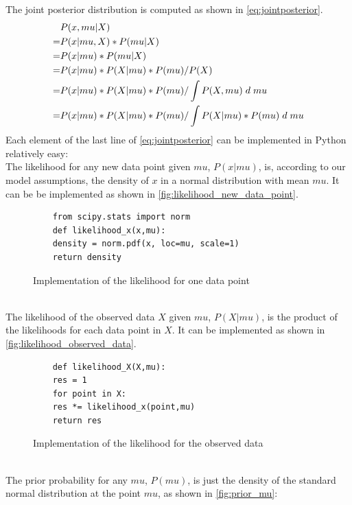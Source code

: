 \documentclass{article}
\begin{document}
The joint posterior distribution is computed as shown in \autoref{eq:jointposterior}.
\begin{equation}
\label{eq:jointposterior}
\begin{split}
&P(x,mu|X) \\
= &P(x|mu,X) * P(mu|X) \\
= &P(x|mu) * P(mu|X) \\
= &P(x|mu) * P(X|mu) * P(mu) / P(X) \\
= &P(x|mu) * P(X|mu) * P(mu) / \int P(X,mu) \hspace{1mm} d \hspace{1mm} mu \\
= &P(x|mu) * P(X|mu) * P(mu) / \int P(X|mu) * P(mu) \hspace{1mm} d \hspace{1mm} mu
\end{split}
\end{equation}
Each element of the last line of \autoref{eq:jointposterior} can be implemented in Python relatively easy: 
\\
The likelihood for any new data point given $mu$, $P(x|mu)$, is, according to our model assumptions, the density of $x$ in a normal distribution with mean $mu$. It can be be implemented as shown in \autoref{fig:likelihood_new_data_point}.
\begin{figure}[h]
	\begin{lstlisting}
	from scipy.stats import norm
	def likelihood_x(x,mu):
	density = norm.pdf(x, loc=mu, scale=1)
	return density
	\end{lstlisting}
	\caption{Implementation of the likelihood for one data point}
	\label{fig:likelihood_new_data_point}
\end{figure}
\\
The likelihood of the observed data $X$ given $mu$, $P(X|mu)$, is the product of the likelihoods for each data point in $X$. It can be implemented as shown in \autoref{fig:likelihood_observed_data}.
\begin{figure}[h]
	\begin{lstlisting}
	def likelihood_X(X,mu):
	res = 1
	for point in X:
	res *= likelihood_x(point,mu)
	return res
	\end{lstlisting}
	\caption{Implementation of the likelihood for the observed data}
	\label{fig:likelihood_observed_data}
\end{figure}
\\
The prior probability for any $mu$, $P(mu)$, is just the density of the standard normal distribution at the point $mu$, as shown in \autoref{fig:prior_mu}:
\end{document}
